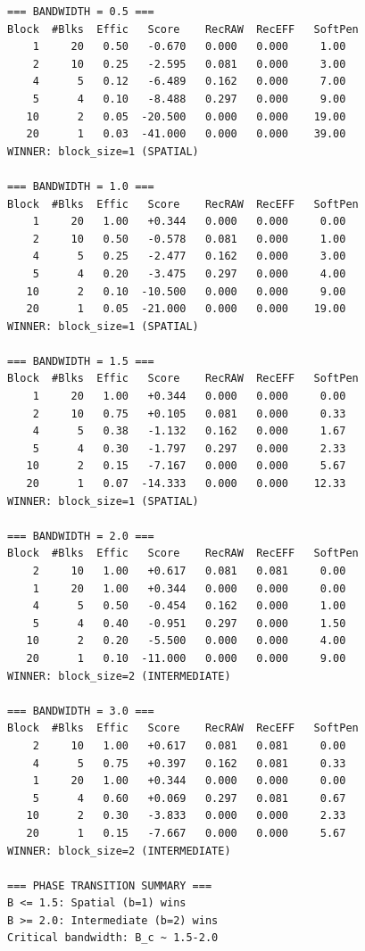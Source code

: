 \documentclass[11pt]{article}
\begin{document}
\begin{lstlisting}[language={},basicstyle=\ttfamily\footnotesize]
=== BANDWIDTH = 0.5 ===
Block  #Blks  Effic   Score    RecRAW  RecEFF   SoftPen
    1     20   0.50   -0.670   0.000   0.000     1.00
    2     10   0.25   -2.595   0.081   0.000     3.00
    4      5   0.12   -6.489   0.162   0.000     7.00
    5      4   0.10   -8.488   0.297   0.000     9.00
   10      2   0.05  -20.500   0.000   0.000    19.00
   20      1   0.03  -41.000   0.000   0.000    39.00
WINNER: block_size=1 (SPATIAL)

=== BANDWIDTH = 1.0 ===
Block  #Blks  Effic   Score    RecRAW  RecEFF   SoftPen
    1     20   1.00   +0.344   0.000   0.000     0.00
    2     10   0.50   -0.578   0.081   0.000     1.00
    4      5   0.25   -2.477   0.162   0.000     3.00
    5      4   0.20   -3.475   0.297   0.000     4.00
   10      2   0.10  -10.500   0.000   0.000     9.00
   20      1   0.05  -21.000   0.000   0.000    19.00
WINNER: block_size=1 (SPATIAL)

=== BANDWIDTH = 1.5 ===
Block  #Blks  Effic   Score    RecRAW  RecEFF   SoftPen
    1     20   1.00   +0.344   0.000   0.000     0.00
    2     10   0.75   +0.105   0.081   0.000     0.33
    4      5   0.38   -1.132   0.162   0.000     1.67
    5      4   0.30   -1.797   0.297   0.000     2.33
   10      2   0.15   -7.167   0.000   0.000     5.67
   20      1   0.07  -14.333   0.000   0.000    12.33
WINNER: block_size=1 (SPATIAL)

=== BANDWIDTH = 2.0 ===
Block  #Blks  Effic   Score    RecRAW  RecEFF   SoftPen
    2     10   1.00   +0.617   0.081   0.081     0.00
    1     20   1.00   +0.344   0.000   0.000     0.00
    4      5   0.50   -0.454   0.162   0.000     1.00
    5      4   0.40   -0.951   0.297   0.000     1.50
   10      2   0.20   -5.500   0.000   0.000     4.00
   20      1   0.10  -11.000   0.000   0.000     9.00
WINNER: block_size=2 (INTERMEDIATE)

=== BANDWIDTH = 3.0 ===
Block  #Blks  Effic   Score    RecRAW  RecEFF   SoftPen
    2     10   1.00   +0.617   0.081   0.081     0.00
    4      5   0.75   +0.397   0.162   0.081     0.33
    1     20   1.00   +0.344   0.000   0.000     0.00
    5      4   0.60   +0.069   0.297   0.081     0.67
   10      2   0.30   -3.833   0.000   0.000     2.33
   20      1   0.15   -7.667   0.000   0.000     5.67
WINNER: block_size=2 (INTERMEDIATE)

=== PHASE TRANSITION SUMMARY ===
B <= 1.5: Spatial (b=1) wins
B >= 2.0: Intermediate (b=2) wins
Critical bandwidth: B_c ~ 1.5-2.0
\end{lstlisting}
\end{document}

